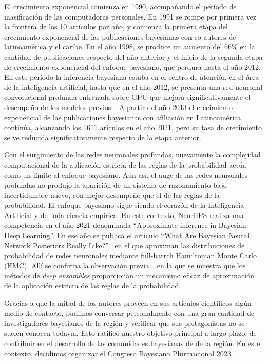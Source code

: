 \documentclass[a4paper,11pt]{book}
\theoremstyle{definition}
\begin{document}
El crecimiento exponencial comienza en 1990, acompa\~nando el per\'iodo de masificaci\'on de las computadoras personales.
%
En 1991 se rompe por primera vez la frontera de los 10 art\'iculos por a\~no, y comienza la primera etapa del crecimiento exponencial de las publicaciones bayesianas con co-autores de latinoam\'erica y el caribe.
%
En el a\~no 1998, se produce un aumento del 66\% en la cantidad de publicaciones respecto del a\~no anterior y el inicio de la segunda etapa de crecimiento exponencial del enfoque bayesiano, que perdura hasta el a\~no 2012.
%
En este per\'iodo la inferencia bayesiana estaba en el centro de atenci\'on en el \'area de la inteligencia artificial, hasta que en el a\~no 2012, se presenta una red neuronal convolucional profunda entrenada sobre GPU que mejora significativamente el desempe\~no de los modelos previos~\cite{Krizhevsky2012}.
%
A partir del a\~no 2013 el crecimiento exponencial de las publicaciones bayesianas con afiliaci\'on en Latinoam\'erica contin\'ua, alcanzando los 1611 ar\'iculos en el a\~no 2021, pero su tasa de crecimiento se ve reducida significativamente respecto de la etapa anterior.


Con el surgimiento de las redes neuronales profundas, nuevamente la complejidad computacional de la aplicaci\'on estricta de las reglas de la probabilidad act\'ua como un l\'imite al enfoque bayesiano.
%
A\'un as\'i, el auge de las redes neuronales profundas no produjo la aparici\'on de un sistema de razonamiento bajo incertidumbre nuevo, con mejor desempe\~no que el de las reglas de la probabilidad.
%
El enfoque bayesiano sigue siendo el coraz\'on de la Inteligencia Artificial y de toda ciencia emp\'irica.
%
En este contexto, NeurlIPS realiza una competencia en el a\~no 2021 denominada ``Approximate inference in Bayesian Deep Learning''.
%
En ese a\~no se publica el art\'iculo ``What Are Bayesian Neural Network Posteriors Really Like?''~\cite{Izmailov2021} en el que aproximan las distribuciones de probabilidad de redes neuronales mediante full-batrch Hamiltonian Monte Carlo (HMC).
%
All\'i se confirma la observaci\'on previa~\cite{Wilson2020}, en la que se muestra que los m\'etodos de \emph{deep ensambles} proporcionan un mecanismo eficaz de aproximaci\'on de la aplicaci\'on estricta de las reglas de la probabilidad.

Gracias a que la mitad de los autores proveen en sus art\'iculos cient\'ificos alg\'un medio de contacto, pudimos conversar personalmente con una gran cantidad de investigadores bayesianos de la regi\'on y verificar que sus protagonistas no se suelen conocen todav\'ia.
%
Esto ratific\'o nuestro objetivo principal a largo plazo, de contribuir en el desarrollo de las comunidades bayesianas de de la regi\'on.
%
En este contexto, decidimos organizar el Congreso Bayesiano Plurinacional 2023.
%
\end{document}
